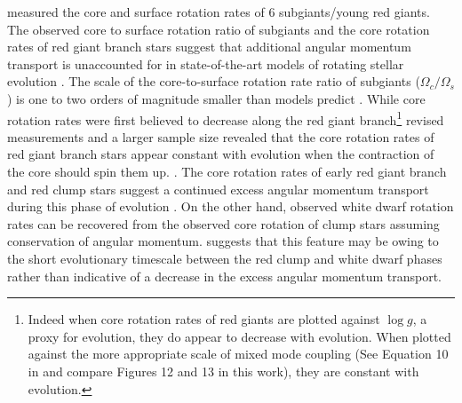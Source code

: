 \citet{deheuvels_seismic_2014} measured the core and surface rotation rates of 6 subgiants/young red giants.
The observed core to surface rotation ratio of subgiants and the core rotation rates of red giant branch stars suggest that additional angular momentum transport is unaccounted for in state-of-the-art models of rotating stellar evolution \citep{deheuvels_seismic_2014, spada_angular_2016, moyano_asteroseismology_2022}.
The scale of the core-to-surface rotation rate ratio of subgiants ($\Omega_c/\Omega_s$) is one to two orders of magnitude smaller than models predict \citep{fuller_asteroseismology_2015,spada_angular_2016,ouazzani_gamma_2018, eggenberger_asteroseismology_2019}.
While core rotation rates were first believed to decrease along the red giant branch\footnote{Indeed when core rotation rates of red giants are plotted against $\log{g}$, a proxy for evolution, they do appear to decrease with evolution. When plotted against the more appropriate scale of mixed mode coupling (See Equation 10 in \citet{gehan_core_2018} and compare Figures 12 and 13 in this work), they are constant with evolution.} \citep{mosser_spin_2012} revised measurements and a larger sample size revealed that the core rotation rates of red giant branch stars appear constant with evolution when the contraction of the core should spin them up.
\citep{mosser_spin_2012,gehan_core_2018,moyano_asteroseismology_2022}.
The core rotation rates of early red giant branch and red clump stars suggest a continued excess angular momentum transport during this phase of evolution \citep{cantiello_angular_2014,moyano_asteroseismology_2022}.
On the other hand, observed white dwarf rotation rates can be recovered from the observed core rotation of clump stars assuming conservation of angular momentum. \citep{cantiello_angular_2014, den_hartogh_constraining_2019}
\citet{cantiello_angular_2014} suggests that this feature may be owing to the short evolutionary timescale between the red clump and white dwarf phases rather than indicative of a decrease in the excess angular momentum transport.


